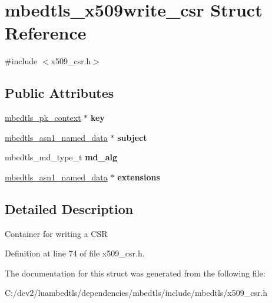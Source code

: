 \hypertarget{structmbedtls__x509write__csr}{\section{mbedtls\-\_\-x509write\-\_\-csr Struct Reference}
\label{structmbedtls__x509write__csr}
}


{\ttfamily \#include $<$x509\-\_\-csr.\-h$>$}

\subsection*{Public Attributes}
\begin{DoxyCompactItemize}
\item 
\hypertarget{structmbedtls__x509write__csr_aa11f0d0cf8328a8fac96047e48185e34}{\hyperlink{structmbedtls__pk__context}{mbedtls\-\_\-pk\-\_\-context} $\ast$ {\bfseries key}}\label{structmbedtls__x509write__csr_aa11f0d0cf8328a8fac96047e48185e34}

\item 
\hypertarget{structmbedtls__x509write__csr_affac2ecd0e1cbb03475e14712b0f1cb7}{\hyperlink{structmbedtls__asn1__named__data}{mbedtls\-\_\-asn1\-\_\-named\-\_\-data} $\ast$ {\bfseries subject}}\label{structmbedtls__x509write__csr_affac2ecd0e1cbb03475e14712b0f1cb7}

\item 
\hypertarget{structmbedtls__x509write__csr_a6ab29632c7e1af29696b739ade6ba2ea}{mbedtls\-\_\-md\-\_\-type\-\_\-t {\bfseries md\-\_\-alg}}\label{structmbedtls__x509write__csr_a6ab29632c7e1af29696b739ade6ba2ea}

\item 
\hypertarget{structmbedtls__x509write__csr_ad90011b91ca8e73856511006f93a6a27}{\hyperlink{structmbedtls__asn1__named__data}{mbedtls\-\_\-asn1\-\_\-named\-\_\-data} $\ast$ {\bfseries extensions}}\label{structmbedtls__x509write__csr_ad90011b91ca8e73856511006f93a6a27}

\end{DoxyCompactItemize}


\subsection{Detailed Description}
Container for writing a C\-S\-R 

Definition at line 74 of file x509\-\_\-csr.\-h.



The documentation for this struct was generated from the following file\-:\begin{DoxyCompactItemize}
\item 
C\-:/dev2/luambedtls/dependencies/mbedtls/include/mbedtls/x509\-\_\-csr.\-h\end{DoxyCompactItemize}
